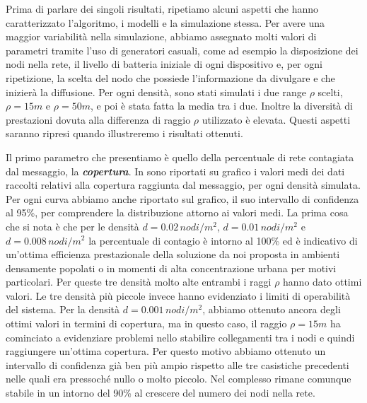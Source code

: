 Prima di parlare dei singoli risultati, ripetiamo alcuni aspetti che hanno caratterizzato l'algoritmo, i modelli e la simulazione stessa. Per avere una maggior variabilità nella simulazione, abbiamo assegnato molti valori di parametri tramite l'uso di generatori casuali, come ad esempio la disposizione dei nodi nella rete, il livello di batteria iniziale di ogni dispositivo e, per ogni ripetizione, la scelta del nodo che possiede l'informazione da divulgare e che inizierà la diffusione. Per ogni densità, sono stati simulati i due range $\rho$ scelti, $\rho=15m$ e $\rho=50m$, e poi è stata fatta la media tra i due. Inoltre la diversità di prestazioni dovuta alla differenza di raggio $\rho$ utilizzato è elevata. Questi aspetti saranno ripresi quando illustreremo i risultati ottenuti.

Il primo parametro che presentiamo è quello della percentuale di rete contagiata dal messaggio, la \textbf{\textit{copertura}}. In  sono riportati su grafico i valori medi dei dati raccolti relativi alla copertura raggiunta dal messaggio, per ogni densità simulata. Per ogni curva abbiamo anche riportato sul grafico, il suo intervallo di confidenza al 95\%, per comprendere la distribuzione attorno ai valori medi. La prima cosa che si nota è che per le densità $d=0.02\, nodi/m^2$, $d=0.01\, nodi/m^2$ e $d=0.008\, nodi/m^2$ la percentuale di contagio è intorno al 100\% ed è indicativo di un'ottima efficienza prestazionale della soluzione da noi proposta in ambienti densamente popolati o in momenti di alta concentrazione urbana per motivi particolari. Per queste tre densità molto alte entrambi i raggi $\rho$ hanno dato ottimi valori. Le tre densità più piccole invece hanno evidenziato i limiti di operabilità del sistema. Per la densità $d=0.001\, nodi/m^2$, abbiamo ottenuto ancora degli ottimi valori in termini di copertura, ma in questo caso, il raggio $\rho=15m$ ha cominciato a evidenziare problemi nello stabilire collegamenti tra i nodi e quindi raggiungere un'ottima copertura. Per questo motivo abbiamo ottenuto un intervallo di confidenza già ben più ampio rispetto alle tre casistiche precedenti nelle quali era pressoché nullo o molto piccolo. Nel complesso rimane comunque stabile in un intorno del 90\% al crescere del numero dei nodi nella rete.
\bigskip
